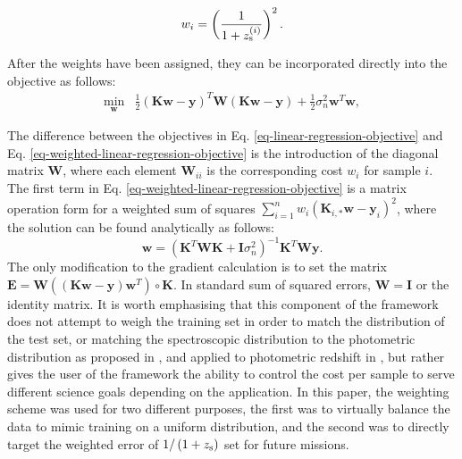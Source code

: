 \documentclass[useAMS,usenatbib,fleqn]{mn2e}
\begin{document}
\begin{equation}
\label{eq-normalized-weights}
w_{i} = \left(\frac{1}{1+z_{\rm s}^{\left(i\right)}}\right)^{2}.
\end{equation}

After the weights have been assigned, they can be incorporated directly into the objective as follows:
\begin{equation}
\label{eq-weighted-linear-regression-objective}
\begin{array}{lcl}
\underset{\mathbf{w}}{\text{min}} &\frac{1}{2}\left ( \mathbf{K}\mathbf{w}-\mathbf{y} \right )^{T} \mathbf{W}\left( \mathbf{K}\mathbf{w}-\mathbf{y} \right )+\frac{1}{2}\sigma_{n}^{2}\mathbf{w}^{T}\mathbf{w},
\end{array}
\end{equation}

The difference between the objectives in Eq. \eqref{eq-linear-regression-objective} and Eq. \eqref{eq-weighted-linear-regression-objective} is the introduction of the diagonal matrix $\mathbf{W}$, where each element $\mathbf{W}_{ii}$ is the corresponding cost $w_{i}$ for sample $i$. The first term in Eq. \eqref{eq-weighted-linear-regression-objective} is a matrix operation form for a weighted sum of squares $\sum_{i=1}^{n}w_{i}\left(\mathbf{K}_{i,*}\mathbf{w}-\mathbf{y}_{i}\right)^{2}$, where the solution can be found analytically as follows:
\begin{equation}
\label{eq-weighted-linear-regression-objective-rectangular}
\mathbf{w} = \left(\mathbf{K}^{T}\mathbf{WK}+\mathbf{I}\sigma_{n}^{2} \right)^{-1}\mathbf{K}^{T}\mathbf{W}\mathbf{y}.
\end{equation}
The only modification to the gradient calculation is to set the matrix $\mathbf{E}=\mathbf{W}\left(\left(\mathbf{K}\mathbf{w}-\mathbf{y}\right)\mathbf{w}^{T}\right)\circ\mathbf{K}$. In standard sum of squared errors, $ \mathbf{W}= \mathbf{I}$ or the identity matrix. It is worth emphasising that this component of the framework does not attempt to weigh the training set in order to match the distribution of the test set, or matching the spectroscopic distribution to the photometric distribution as proposed in \citet{Lima2008}, \citet{Cunha2009} and applied to photometric redshift in \citet{sanchez14}, but rather gives the user of the framework the ability to control the cost per sample to serve different science goals depending on the application. In this paper, the weighting scheme was used for two different purposes, the first was to virtually balance the data to mimic training on a uniform distribution, and the second was to directly target the weighted error of $1/\left(1+z_{\rm s}\right)$ set for future missions.
\end{document}
